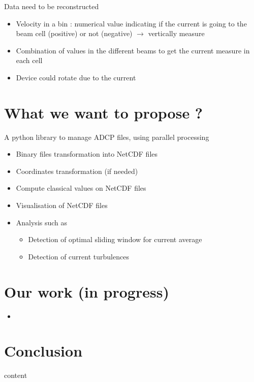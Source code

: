\documentclass[11pt]{beamer}
\begin{document}
	\begin{frame}{Data need to be reconstructed}
		\begin{itemize}
			\item Velocity in a bin : numerical value indicating if the current is going to the beam cell (positive) or not (negative) $\rightarrow$ vertically measure
			\item Combination of values in the different beams to get the current measure in each cell
			\item Device could rotate due to the current
		\end{itemize}
	\end{frame}

	\section{What we want to propose ?}
	\begin{frame}{\secname}
		A python library to manage ADCP files, using parallel processing
		\begin{itemize}
			\item Binary files transformation into NetCDF files
			\item Coordinates transformation (if needed)
			\item Compute classical values on NetCDF files
			\item Visualisation of NetCDF files
			\item Analysis such as
				\begin{itemize}
					\item Detection of optimal sliding window for current average
					\item Detection of current turbulences
				\end{itemize}
		\end{itemize}
	\end{frame}

	\section{Our work (in progress)}
	\begin{frame}{\secname}
		\begin{itemize}
			
			\item 
		\end{itemize}
	\end{frame}

	\section{Conclusion}
	\begin{frame}{\secname}
		content
	\end{frame}
\end{document}

